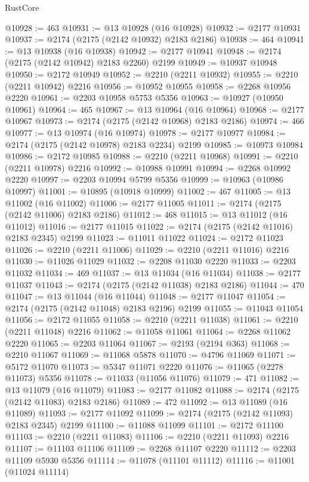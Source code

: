 \begin{lexlean}{RustCore}
\begin{coremodule}
@10928 := 463
@10931 := @13 @10928 (@16 @10928)
@10932 := @2177 @10931
@10937 := @2174 (@2175 (@2142 @10932) @2183 @2186)
@10938 := 464
@10941 := @13 @10938 (@16 @10938)
@10942 := @2177 @10941
@10948 := @2174 (@2175 (@2142 @10942) @2183 @2260) @2199
@10949 := @10937 @10948
@10950 := @2172 @10949
@10952 := @2210 (@2211 @10932)
@10955 := @2210 (@2211 @10942) @2216
@10956 := @10952 @10955
@10958 := @2268 @10956 @2220
@10961 := @2203 @10958 @5753 @5356
@10963 := @10927 (@10950 @10961)
@10964 := 465
@10967 := @13 @10964 (@16 @10964)
@10968 := @2177 @10967
@10973 := @2174 (@2175 (@2142 @10968) @2183 @2186)
@10974 := 466
@10977 := @13 @10974 (@16 @10974)
@10978 := @2177 @10977
@10984 := @2174 (@2175 (@2142 @10978) @2183 @2234) @2199
@10985 := @10973 @10984
@10986 := @2172 @10985
@10988 := @2210 (@2211 @10968)
@10991 := @2210 (@2211 @10978) @2216
@10992 := @10988 @10991
@10994 := @2268 @10992 @2220
@10997 := @2203 @10994 @5799 @5356
@10999 := @10963 (@10986 @10997)
@11001 := @10895 (@10918 @10999)
@11002 := 467
@11005 := @13 @11002 (@16 @11002)
@11006 := @2177 @11005
@11011 := @2174 (@2175 (@2142 @11006) @2183 @2186)
@11012 := 468
@11015 := @13 @11012 (@16 @11012)
@11016 := @2177 @11015
@11022 := @2174 (@2175 (@2142 @11016) @2183 @2345) @2199
@11023 := @11011 @11022
@11024 := @2172 @11023
@11026 := @2210 (@2211 @11006)
@11029 := @2210 (@2211 @11016) @2216
@11030 := @11026 @11029
@11032 := @2208 @11030 @2220
@11033 := @2203 @11032
@11034 := 469
@11037 := @13 @11034 (@16 @11034)
@11038 := @2177 @11037
@11043 := @2174 (@2175 (@2142 @11038) @2183 @2186)
@11044 := 470
@11047 := @13 @11044 (@16 @11044)
@11048 := @2177 @11047
@11054 := @2174 (@2175 (@2142 @11048) @2183 @2196) @2199
@11055 := @11043 @11054
@11056 := @2172 @11055
@11058 := @2210 (@2211 @11038)
@11061 := @2210 (@2211 @11048) @2216
@11062 := @11058 @11061
@11064 := @2268 @11062 @2220
@11065 := @2203 @11064
@11067 := @2193 (@2194 @363)
@11068 := @2210 @11067
@11069 := @11068 @5878
@11070 := @4796 @11069
@11071 := @5172 @11070
@11073 := @5347 @11071 @2220
@11076 := @11065 (@2278 @11073) @5356
@11078 := @11033 (@11056 @11076)
@11079 := 471
@11082 := @13 @11079 (@16 @11079)
@11083 := @2177 @11082
@11088 := @2174 (@2175 (@2142 @11083) @2183 @2186)
@11089 := 472
@11092 := @13 @11089 (@16 @11089)
@11093 := @2177 @11092
@11099 := @2174 (@2175 (@2142 @11093) @2183 @2345) @2199
@11100 := @11088 @11099
@11101 := @2172 @11100
@11103 := @2210 (@2211 @11083)
@11106 := @2210 (@2211 @11093) @2216
@11107 := @11103 @11106
@11109 := @2268 @11107 @2220
@11112 := @2203 @11109 @5930 @5356
@11114 := @11078 (@11101 @11112)
@11116 := @11001 (@11024 @11114)

\end{coremodule}
\end{lexlean}
